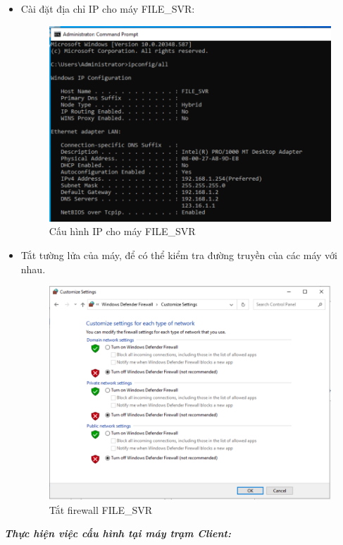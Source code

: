   \begin{itemize}
      \item Cài đặt địa chỉ IP cho máy FILE\_SVR:
      
      \begin{figure}[htbp]
        \centering
        \includegraphics[width=0.7\linewidth]{SiteToSiteImg/ipFILESVR.png}
        \caption{Cấu hình IP cho máy FILE\_SVR}
    \end{figure}
    
      \item Tắt tường lửa của máy, để có thể kiểm tra đường truyền của các máy với nhau.

        \begin{figure}[htbp]
        \centering
        \includegraphics[width=0.5\linewidth]{SiteToSiteImg/offFirewall.png}
        \caption{Tắt firewall FILE\_SVR}
        \end{figure}
      
  \end{itemize}
    \newpage
  \textbf{\textit{Thực hiện việc cấu hình tại máy trạm Client:}}

